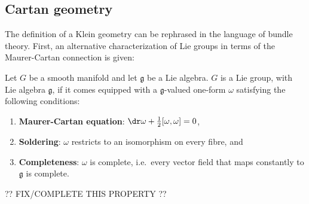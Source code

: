 
\subsection{Cartan geometry}

    The definition of a Klein geometry can be rephrased in the language of bundle theory. First, an alternative characterization of Lie groups in terms of the Maurer-Cartan connection is given:
    \begin{adefinition}
        Let $G$ be a smooth manifold and let $\mathfrak{g}$ be a Lie algebra. $G$ is a Lie group, with Lie algebra $\mathfrak{g}$, if it comes equipped with a $\mathfrak{g}$-valued one-form $\omega$ satisfying the following conditions:
        \begin{enumerate}
            \item\textbf{Maurer-Cartan equation}: $\dr\omega + \frac{1}{2}[\omega,\omega]=0$,
            \item\textbf{Soldering}: $\omega$ restricts to an isomorphism on every fibre, and
            \item\textbf{Completeness}: $\omega$ is complete, i.e.~every vector field that maps constantly to $\mathfrak{g}$ is complete.
        \end{enumerate}

        ?? FIX/COMPLETE THIS PROPERTY ??
    \end{adefinition}

